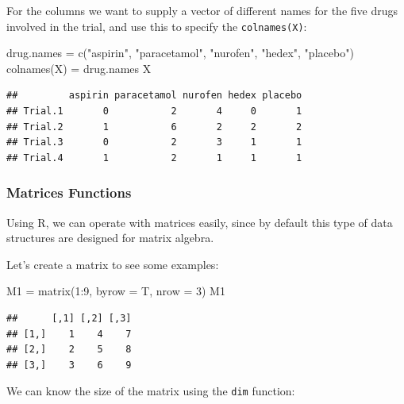 \documentclass[
]{book}
\newenvironment{Shaded}{\begin{snugshade}}{\end{snugshade}}
\newcommand{\AttributeTok}[1]{\textcolor[rgb]{0.77,0.63,0.00}{#1}}
\newcommand{\DecValTok}[1]{\textcolor[rgb]{0.00,0.00,0.81}{#1}}
\newcommand{\FunctionTok}[1]{\textcolor[rgb]{0.00,0.00,0.00}{#1}}
\newcommand{\NormalTok}[1]{#1}
\newcommand{\OtherTok}[1]{\textcolor[rgb]{0.56,0.35,0.01}{#1}}
\newcommand{\SpecialCharTok}[1]{\textcolor[rgb]{0.00,0.00,0.00}{#1}}
\newcommand{\StringTok}[1]{\textcolor[rgb]{0.31,0.60,0.02}{#1}}
\begin{document}
For the columns we want to supply a vector of different names for the five drugs involved in the trial, and use this to specify the \texttt{colnames(X)}:

\begin{Shaded}
\begin{Highlighting}[]
\NormalTok{drug.names }\OtherTok{=} \FunctionTok{c}\NormalTok{(}\StringTok{"aspirin"}\NormalTok{, }\StringTok{"paracetamol"}\NormalTok{, }\StringTok{"nurofen"}\NormalTok{, }\StringTok{"hedex"}\NormalTok{, }\StringTok{"placebo"}\NormalTok{)}
\FunctionTok{colnames}\NormalTok{(X) }\OtherTok{=}\NormalTok{ drug.names}
\NormalTok{X}
\end{Highlighting}
\end{Shaded}

\begin{verbatim}
##         aspirin paracetamol nurofen hedex placebo
## Trial.1       0           2       4     0       1
## Trial.2       1           6       2     2       2
## Trial.3       0           2       3     1       1
## Trial.4       1           2       1     1       1
\end{verbatim}

\hypertarget{matrices-functions}{%
\subsubsection{Matrices Functions}\label{matrices-functions}}

Using R, we can operate with matrices easily, since by default this type of data structures are designed for matrix algebra.

Let's create a matrix to see some examples:

\begin{Shaded}
\begin{Highlighting}[]
\NormalTok{M1 }\OtherTok{=} \FunctionTok{matrix}\NormalTok{(}\DecValTok{1}\SpecialCharTok{:}\DecValTok{9}\NormalTok{, }\AttributeTok{byrow =}\NormalTok{ T, }\AttributeTok{nrow =} \DecValTok{3}\NormalTok{)}
\NormalTok{M1}
\end{Highlighting}
\end{Shaded}

\begin{verbatim}
##      [,1] [,2] [,3]
## [1,]    1    4    7
## [2,]    2    5    8
## [3,]    3    6    9
\end{verbatim}

We can know the size of the matrix using the \texttt{dim} function:
\end{document}
